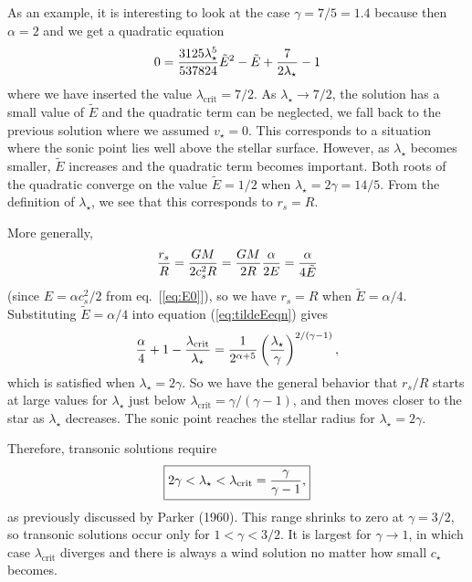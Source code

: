 \documentclass[preprint,12pt]{aastex}
\begin{document}
As an example, it is interesting to look at the case $\gamma=7/5=1.4$ because then $\alpha=2$ and we get a quadratic equation
\begin{equation}
0 = {3125\lambda_\star^5\over 537824}\tilde{E}^2 -\tilde{E} + {7\over 2\lambda_\star}-1
\end{equation}
where we have inserted the value $\lambda_\mathrm{crit}=7/2$. As $\lambda_\star\rightarrow 7/2$, the solution has a small value of $\tilde{E}$ and the quadratic term can be neglected, we fall back to the previous solution where we assumed $v_\star=0$. This corresponds to a situation where the sonic point lies well above the stellar surface. However, as $\lambda_\star$ becomes smaller, $\tilde{E}$ increases and the quadratic term becomes important. Both roots of the quadratic converge on the value $\tilde{E}=1/2$ when $\lambda_\star = 2\gamma = 14/5$. From the definition of $\lambda_\star$, we see that this corresponds to $r_s=R$. 

More generally, 
\begin{equation}
{r_s\over R} = {GM\over 2c_s^2R} = {GM\over 2R} {\alpha\over 2E} = {\alpha\over 4\tilde{E}}
\end{equation}
(since $E = \alpha c_s^2/2$ from eq.~[\ref{eq:E0}]), so we have $r_s=R$ when $\tilde{E} = \alpha/4$. Substituting $\tilde{E}=\alpha/4$ into equation (\ref{eq:tildeEeqn}) gives
\begin{equation}
{\alpha\over 4} + 1 - {\lambda_\mathrm{crit}\over \lambda_\star} = {1\over 2^{\alpha+5}} \left({\lambda_\star\over \gamma}\right)^{2/(\gamma-1)},
\end{equation}
which is satisfied when $\lambda_\star = 2\gamma$. So we have the general behavior that $r_s/R$ starts at large values for $\lambda_\star$ just below $\lambda_\mathrm{crit}=\gamma/(\gamma-1)$, and then moves closer to the star as $\lambda_\star$ decreases. The sonic point reaches the stellar radius for $\lambda_\star=2\gamma$. 

Therefore, transonic solutions require
\begin{equation}
\boxed{
2\gamma < \lambda_\star < \lambda_\mathrm{crit} ={\gamma\over \gamma-1},
}
\end{equation}
as previously discussed by Parker (1960). This range shrinks to zero at $\gamma=3/2$, so transonic solutions occur only for $1<\gamma<3/2$. It is largest for $\gamma\rightarrow 1$, in which case $\lambda_\mathrm{crit}$ diverges and there is always a wind solution no matter how small $c_\star$ becomes.
\end{document}

